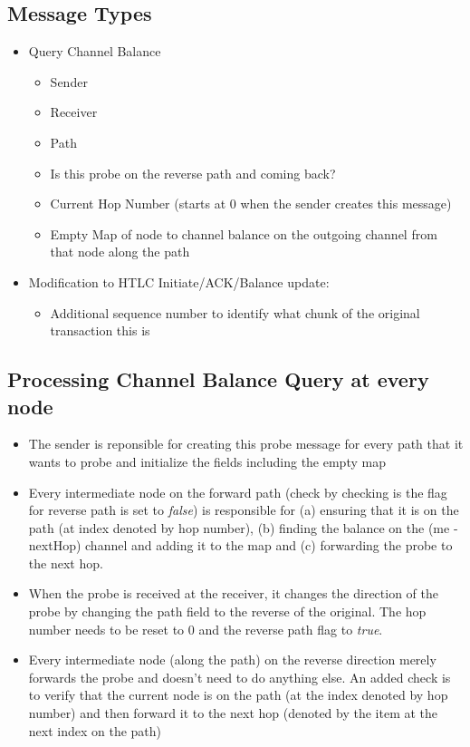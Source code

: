 \documentclass[a4paper]{article}
\begin{document}
\subsection{Message Types}
\begin{itemize}
    \item Query Channel Balance
        \begin{itemize}
            \item Sender
            \item Receiver
            \item Path 
            \item Is this probe on the reverse path and coming back?
            \item Current Hop Number (starts at 0 when the sender creates this message)
            \item Empty Map of node to channel balance on the outgoing channel from that node along the path
        \end{itemize}


    \item Modification to HTLC Initiate/ACK/Balance update:
        \begin{itemize}
            \item Additional sequence number to identify what chunk of the original transaction this is
        \end{itemize}

\end{itemize}

\subsection{Processing Channel Balance Query at every node}
\begin{itemize}
    \item The sender is reponsible for creating this probe message for every path that it wants to probe and initialize the fields including the empty map

    \item Every intermediate node on the forward path (check by checking is the flag for reverse path is set to {\em{false}}) 
        is responsible for (a) ensuring that it is on the path (at index denoted by hop number), (b) finding
        the balance on the (me - nextHop) channel and adding it to the map and (c) forwarding the probe to the next hop. 
    \item When the probe is received at the receiver, it changes the direction of the probe by changing the path field to the reverse of the original. 
        The hop number needs to be reset to $0$ and the reverse path flag to {\em{true}}.

    \item Every intermediate node (along the path) on the reverse direction merely forwards the probe and doesn't need to do anything else. An added check is to
        verify that the current node is on the path (at the index denoted by hop number) and then forward it to the next hop (denoted by the item at the next index
        on the path)
\end{itemize}
\end{document}
